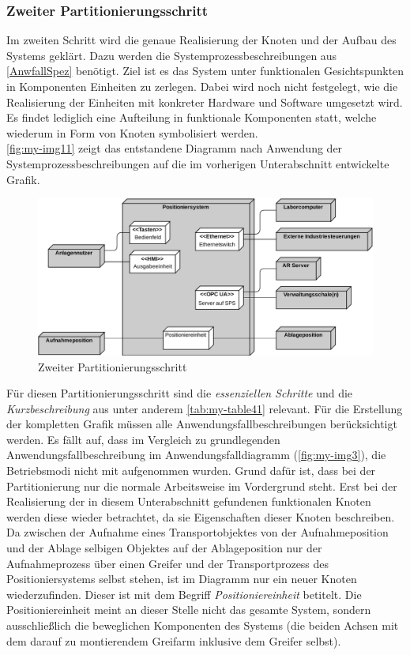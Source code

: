 \documentclass[../../../Bachelorarbeit.tex]{subfiles}
\begin{document}
\subsubsection{Zweiter Partitionierungsschritt}
Im zweiten Schritt wird die genaue Realisierung der Knoten und der Aufbau des Systems geklärt. Dazu werden die Systemprozessbeschreibungen aus \autoref{AnwfallSpez} benötigt. Ziel ist es das System unter funktionalen Gesichtspunkten in Komponenten \bzw Einheiten zu zerlegen. Dabei wird noch nicht festgelegt, wie die Realisierung der Einheiten mit konkreter Hardware und Software umgesetzt wird. Es findet lediglich eine Aufteilung in funktionale Komponenten statt, welche wiederum in Form von Knoten symbolisiert werden. \\
\autoref{fig:my-img11} zeigt das entstandene Diagramm nach Anwendung der Systemprozessbeschreibungen auf die im vorherigen Unterabschnitt entwickelte Grafik. 

\begin{figure}[H]
    \centering
    \includegraphics[width=\textwidth]{Images/zweiter_schritt.pdf}
    \caption[Zweiter Partitionierungsschritt]{Zweiter Partitionierungsschritt}
    \label{fig:my-img11}
\end{figure}

Für diesen Partitionierungsschritt sind die \textit{essenziellen Schritte} und die \textit{Kurzbeschreibung} aus unter anderem \autoref{tab:my-table41} relevant. Für die Erstellung der kompletten Grafik müssen alle Anwendungsfallbeschreibungen berücksichtigt werden. Es fällt auf, dass im Vergleich zu grundlegenden Anwendungsfallbeschreibung im Anwendungsfalldiagramm (\autoref{fig:my-img3}), die Betriebsmodi nicht mit aufgenommen wurden. Grund dafür ist, dass bei der Partitionierung nur die normale Arbeitsweise im Vordergrund steht. Erst bei der Realisierung der in diesem Unterabschnitt gefundenen funktionalen Knoten werden diese wieder betrachtet, da sie Eigenschaften dieser Knoten beschreiben.\\
Da zwischen der Aufnahme eines Transportobjektes von der Aufnahmeposition und der Ablage selbigen Objektes auf der Ablageposition nur der Aufnahmeprozess über einen Greifer und der Transportprozess des Positioniersystems selbst stehen, ist im Diagramm nur ein neuer Knoten wiederzufinden. Dieser ist mit dem Begriff \textit{Positioniereinheit} betitelt. Die Positioniereinheit meint an dieser Stelle nicht das gesamte System, sondern ausschließlich die beweglichen Komponenten des Systems (die beiden Achsen mit dem darauf zu montierendem Greifarm inklusive dem Greifer selbst).
\end{document}
